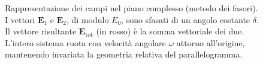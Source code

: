 \documentclass[a4paper,11pt]{report}
\begin{document}
\begin{figure}[htbp]
\begin{tikzpicture}[scale=1.2, >=latex]


    \end{tikzpicture}
    \caption{Rappresentazione dei campi nel piano complesso (metodo dei fasori). I vettori $\mathbf{E}_1$ e $\mathbf{E}_2$, di modulo $E_0$, sono sfasati di un angolo costante $\delta$. Il vettore risultante $\mathbf{E}_{\text{tot}}$ (in rosso) è la somma vettoriale dei due. L'intero sistema ruota con velocità angolare $\omega$ attorno all'origine, mantenendo invariata la geometria relativa del parallelogramma.}
    \label{fig:fasori_interferenza}
\end{figure}
\end{document}
